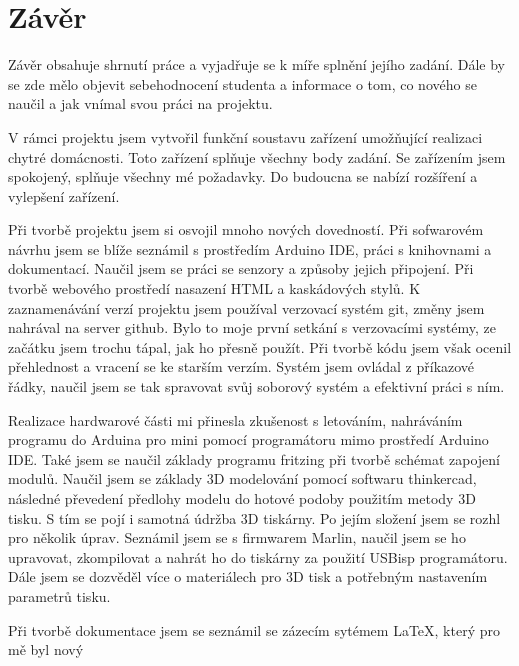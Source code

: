 \documentclass[11pt,a4paper,twoside,openright]{report}
\let\openright=\cleardoublepage
\begin{document}
	
	\chapter*{Závěr}
	\pagestyle{empty}
	
	
	Závěr obsahuje shrnutí práce a vyjadřuje se k míře splnění jejího zadání. Dále by se zde mělo objevit sebehodnocení studenta a informace o tom, co nového se naučil a jak vnímal svou práci na projektu.
	
	V rámci projektu jsem vytvořil funkční soustavu zařízení umožňující realizaci chytré domácnosti. Toto zařízení splňuje všechny body zadání. Se zařízením jsem spokojený, splňuje všechny mé požadavky. Do budoucna se nabízí rozšíření a vylepšení zařízení.
	
	
	Při tvorbě projektu jsem si osvojil mnoho nových dovedností. Při sofwarovém návrhu jsem se blíže seznámil s prostředím Arduino IDE, práci s knihovnami a dokumentací. Naučil jsem se práci se senzory a způsoby jejich připojení. Při tvorbě webového prostředí nasazení HTML a kaskádových stylů. K zaznamenávání verzí projektu jsem používal verzovací systém git, změny jsem nahrával na server github. Bylo to moje první setkání s verzovacími systémy, ze začátku jsem trochu tápal, jak ho přesně použít. Při tvorbě kódu jsem však ocenil přehlednost a vracení se ke starším verzím. Systém jsem ovládal z příkazové řádky, naučil jsem se tak spravovat svůj soborový systém a efektivní práci s ním.
	
	
	Realizace hardwarové části mi přinesla zkušenost s letováním, nahráváním programu do Arduina pro mini pomocí programátoru mimo prostředí Arduino IDE. Také jsem se naučil základy programu fritzing při tvorbě schémat zapojení modulů. Naučil jsem se základy 3D modelování pomocí softwaru thinkercad, následné převedení předlohy modelu do hotové podoby použitím metody 3D tisku. S tím se pojí i samotná údržba 3D tiskárny. Po jejím složení jsem se rozhl pro několik úprav. Seznámil jsem se s firmwarem Marlin, naučil jsem se ho upravovat, zkompilovat a nahrát ho do tiskárny za použití USBisp programátoru. Dále jsem se dozvěděl více o materiálech pro 3D tisk a potřebným nastavením parametrů tisku.
	
	
	Při tvorbě dokumentace jsem se seznámil se zázecím sytémem \LaTeX, který pro mě byl nový 
	
	\nocite{einstein}\nocite{maly}\nocite{knuthwebsite}\nocite{ucebnice}\nocite{polovodicovatechnika}\nocite{šrait}\nocite{techtutorials}
	\printbibliography[title={Seznam použité literatury},heading={bibintoc}]
	
	\openright
	\listoffigures
	
	\clearpage
	\listoftables
	
	
	
\end{document}
